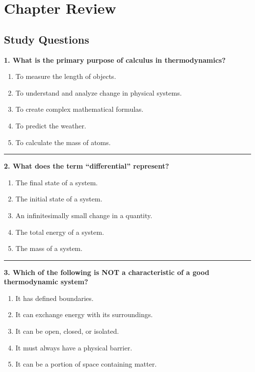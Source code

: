 \documentclass[
  9pt,
]{extbook}
\providecommand{\tightlist}{%
  \setlength{\itemsep}{0pt}\setlength{\parskip}{0pt}}
\theoremstyle{definition}
\theoremstyle{definition}
\theoremstyle{definition}
\theoremstyle{remark}
\begin{document}
\hypertarget{rev1}{%
\section{Chapter Review}\label{rev1}}

\hypertarget{quest1}{%
\subsection{Study Questions}\label{quest1}}

\textbf{1. What is the primary purpose of calculus in thermodynamics?}

\begin{enumerate}
\def\labelenumi{\alph{enumi}.}
\tightlist
\item
  To measure the length of objects.
\item
  To understand and analyze change in physical systems.
\item
  To create complex mathematical formulas.
\item
  To predict the weather.
\item
  To calculate the mass of atoms.
\end{enumerate}

\begin{center}\rule{0.5\linewidth}{0.5pt}\end{center}

\textbf{2. What does the term ``differential'' represent?}

\begin{enumerate}
\def\labelenumi{\alph{enumi}.}
\tightlist
\item
  The final state of a system.
\item
  The initial state of a system.
\item
  An infinitesimally small change in a quantity.
\item
  The total energy of a system.
\item
  The mass of a system.
\end{enumerate}

\begin{center}\rule{0.5\linewidth}{0.5pt}\end{center}

\textbf{3. Which of the following is NOT a characteristic of a good thermodynamic system?}

\begin{enumerate}
\def\labelenumi{\alph{enumi}.}
\tightlist
\item
  It has defined boundaries.
\item
  It can exchange energy with its surroundings.
\item
  It can be open, closed, or isolated.
\item
  It must always have a physical barrier.
\item
  It can be a portion of space containing matter.
\end{enumerate}
\end{document}
